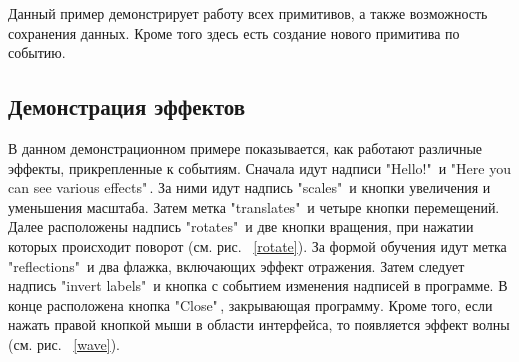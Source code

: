 \documentclass[14pt]{extarticle}
\begin{document}
		\pagebreak
	Данный пример демонстрирует работу всех примитивов, а также возможность сохранения данных. Кроме того здесь есть создание нового примитива по событию.  
	
	\subsection{Демонстрация эффектов}
	
	В данном демонстрационном примере показывается, как работают различные эффекты, прикрепленные к событиям. 
	Сначала идут надписи "Hello!"\, и "Here you can see various effects"\,.
	За ними идут надпись "scales"\, и кнопки увеличения и уменьшения масштаба.
	Затем метка "translates"\, и четыре кнопки перемещений. 
	Далее расположены надпись "rotates"\, и две кнопки вращения, при нажатии которых происходит поворот (см. рис. ~\ref{rotate}).
	За формой обучения идут метка "reflections"\, и два флажка, включающих эффект отражения.
	Затем  следует надпись "invert labels"\, и кнопка с событием изменения надписей в программе.
	В конце расположена кнопка "Close"\,, закрывающая программу. 
	Кроме того, если нажать правой кнопкой мыши в области интерфейса, то появляется эффект волны (см. рис. ~\ref{wave}). 
	
\end{document}
